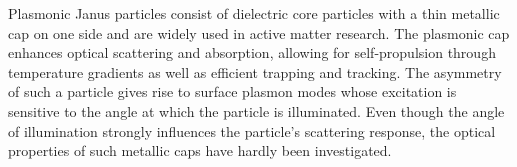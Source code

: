 


Plasmonic Janus particles consist of dielectric core particles with a thin metallic cap on one side and are widely used in active matter research. \cite{MONA-flow-fields} 
The plasmonic cap enhances optical scattering and absorption, allowing for self-propulsion through temperature gradients as well as efficient trapping and tracking. \cite{MONA-thermotaxis, MONA-photon-nudging-1} 
The asymmetry of such a particle gives rise to surface plasmon modes whose excitation is sensitive to the angle at which the particle is illuminated. 
Even though the angle of illumination strongly influences the particle's scattering response, the optical properties of such metallic caps have hardly been investigated. 

